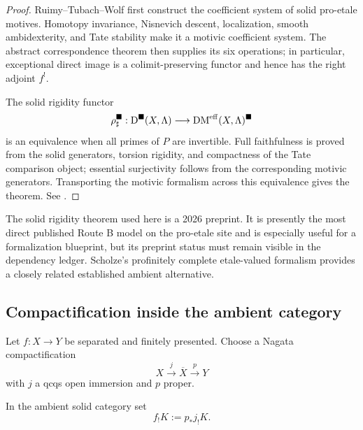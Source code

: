 \begin{proof}
Ruimy--Tubach--Wolf first construct the coefficient system of solid
pro-etale motives.  Homotopy invariance, Nisnevich descent, localization,
smooth ambidexterity, and Tate stability make it a motivic coefficient
system.  The abstract correspondence theorem then supplies its six
operations; in particular, exceptional direct image is a colimit-preserving
functor and hence has the right adjoint \(f^!\).

The solid rigidity functor
\[
 \rho^{\blacksquare}_{\sharp}:
 \mathrm D^{\blacksquare}(X,\Lambda)\longrightarrow
 \operatorname{DM}^{\mathrm{eff}}(X,\Lambda)^{\blacksquare}
\]
is an equivalence when all primes of \(P\) are invertible.  Full faithfulness
is proved from the solid generators, torsion rigidity, and compactness of the
Tate comparison object; essential surjectivity follows from the corresponding
motivic generators.  Transporting the motivic formalism across this
equivalence gives the theorem.  See
\cite[Theorems~2.5.4 and~3.3.7]{RuimyTubachWolfSolid}.
\end{proof}

\begin{warning}
The solid rigidity theorem used here is a 2026 preprint.  It is presently the
most direct published Route B model on the pro-etale site and is especially
useful for a formalization blueprint, but its preprint status must remain
visible in the dependency ledger.  Scholze's profinitely complete
etale-valued formalism \cite[Theorems~7.15--7.16]{ScholzeSixFunctors}
provides a closely related established ambient alternative.
\end{warning}

\subsection{Compactification inside the ambient category}

Let \(f:X\to Y\) be separated and finitely presented.  Choose a Nagata
compactification
\[
 X\xrightarrow{j}\overline X\xrightarrow{p}Y
\]
with \(j\) a qcqs open immersion and \(p\) proper.

\begin{definition}
\label{def:proetale-fshriek}
In the ambient solid category set
\begin{equation}
\label{eq:fshriek-compactification}
 f_!K:=p_*j_!K.
\end{equation}
\end{definition}

